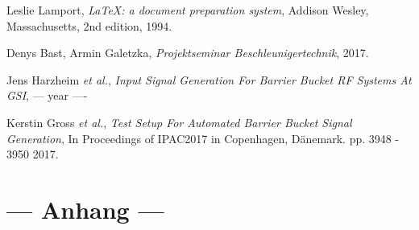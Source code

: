 \documentclass[../Report.tex]{subfiles}
\begin{document}


\begin{thebibliography}{9}

  Leslie Lamport,
  \textit{\LaTeX: a document preparation system},
  Addison Wesley, Massachusetts,
  2nd edition,
  1994.
  
	Denys Bast, Armin Galetzka, 
	\textit{Projektseminar Beschleunigertechnik},
	2017.
 
	Jens Harzheim \textit{et al.}, 
	\textit{Input Signal Generation For Barrier Bucket RF Systems At GSI},
	--- year ----
	
	Kerstin Gross \textit{et al.},
	\textit{Test Setup For Automated Barrier Bucket Signal Generation},
	In Proceedings of IPAC2017 in Copenhagen, Dänemark. 
	pp. 3948 - 3950
	2017.

\end{thebibliography}

\chapter{--- Anhang --- }
\label{chap:anhang}


\end{document}
